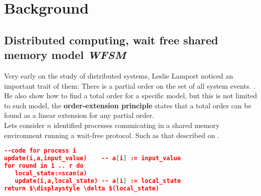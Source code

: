 \documentclass{tufte-book} %
\newcommand{\sh}{\textbf{\textit{WFSM}}\xspace}
\begin{document}
%





\chapter{Background} %
\section{Distributed computing, wait free shared memory model \sh}

Very early on the study of distributed systems, Leslie Lamport noticed an important trait of them: There is a partial order on the set of all system events. \cite{Lamport78}. He also show how to find a total order for a specific model, but this is not limited to such model, the {\bf order-extension principle} states that a total order can be found as a linear extension for any partial order.\\

Lets consider $n$ identified processes comunicating in a shared memory enviromnent running a wait-free protocol. Such as that described on \cite{Herlihy1999}.\\

\begin{lstlisting}[mathescape,language=json,firstnumber=1,basicstyle=\footnotesize,commentstyle=\color{gray},caption={Normal form wait free protocol},label=amb]
--code for process i 
update(i,a,input_value)    -- a[i] := input_value
for round in 1 .. r do
   local_state:=scan(a)
   update(i,a,local_state) -- a[i] := local_state
return $\displaystyle \delta $(local_state)
\end{lstlisting}
\end{document}
